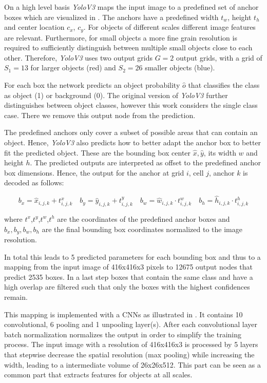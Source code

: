	On a high level basis \textit{YoloV3} maps the input image to a predefined set of anchor boxes which are visualized in . The anchors have a predefined width $t_w$, height $t_h$ and center location $c_x$, $c_y$. For objects of different scales different image features are relevant. Furthermore, for small objects a more fine grain resolution is required to sufficiently distinguish between multiple small objects close to each other. Therefore, \textit{YoloV3} uses two output grids $G=2$ output grids, with a grid of $S_1 =13$ for larger objects (red) and $S_2 = 26$ smaller objects (blue). 
	
	For each box the network predicts an object probability $\hat o$ that classifies the class as object (1) or background (0). The original version of \textit{YoloV3} further distinguishes between object classes, however this work considers the single class case. There we remove this output node from the prediction. 
	
	The predefined anchors only cover a subset of possible areas that can contain an object. Hence, \textit{YoloV3} also predicts how to better adapt the anchor box to better fit the predicted object. These are the bounding box center $\hat x,\hat y$, its width $w$ and height $h$. The predicted outputs are interpreted as offset to the predefined anchor box dimensions. Hence, the output for the anchor at grid $i$, cell $j$, anchor $k$  is decoded as follows:
	
	\begin{equation}
	b_x = \hat x_{i,j,k} + t^x_{i,j,k}\quad
	b_y = \hat y_{i,j,k} + t^y_{i,j,k}\quad
	b_w = \hat w_{i,j,k} \cdot t^w_{i,j,k}\quad
	b_h = \hat h_{i,j,k} \cdot t^h_{i,j,k}
	\end{equation}
	
	where $t^x$,$t^y$,$t^w$,$t^h$ are the coordinates of the predefined anchor boxes and $b_x,b_y,b_w,b_h$ are the final bounding box coordinates normalized to the image resolution.
		
	In total this leads to 5 predicted parameters for each bounding box and thus to a mapping from the input image of 416x416x3 pixels to 12675 output nodes that predict 2535 boxes. In a last step boxes that contain the same class and have a high overlap are filtered such that only the boxes with the highest confidences remain.	
			
	This mapping is implemented with a \acp{CNN} as illustrated in  . It contains 10 convolutional, 6 pooling and 1 unpooling layer(s). After each convolutional layer batch normalization normalizes the output in order to simplify the training process.
	The input image with a resolution of 416x416x3 is processed by 5 layers that stepwise decrease the spatial resolution (max pooling) while increasing the width, leading to a intermediate volume of 26x26x512. This part can be seen as a common part that extracts features for objects at all scales. 
	
